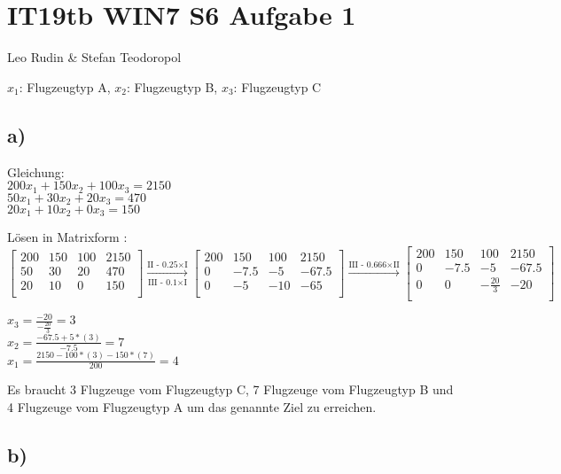 \documentclass{article}
\begin{document}
\section*{IT19tb WIN7 S6 Aufgabe 1}
Leo Rudin \& Stefan Teodoropol

\(x_1\): Flugzeugtyp A, \(x_2\): Flugzeugtyp B, \(x_3\): Flugzeugtyp C

\subsection*{a)}

Gleichung:\\
\(200x_1 + 150x_2 + 100x_3 = 2150\)\\
\(50x_1 + 30x_2 + 20x_3 = 470\)\\
\(20x_1 + 10x_2 + 0x_3 = 150\)

Lösen in Matrixform :
\[
\begin{bmatrix} 
200 & 150 & 100 & 2150 \\
50 & 30 & 20 & 470 \\
20 & 10 & 0 & 150 \\
\end{bmatrix}
\xrightarrow[\text{III - 0.1}\times\text{I}]{\text{II - 0.25}\times\text{I}}
\begin{bmatrix} 
200 & 150 & 100 & 2150 \\
0 & -7.5 & -5 & -67.5 \\
0 & -5 & -10 & -65 \\
\end{bmatrix}
\xrightarrow{\text{III - 0.666}\times\text{II}}
\begin{bmatrix} 
200 & 150 & 100 & 2150 \\
0 & -7.5 & -5 & -67.5 \\
0 & 0 & -\frac{20}{3} & -20 \\
\end{bmatrix}
\]

\(x_3 = \frac{-20}{-\frac{20}{3}} = 3\)\\
\(x_2 = \frac{-67.5 + 5*(3)}{-7.5} = 7\)\\
\(x_1 = \frac{2150 - 100*(3) - 150*(7)}{200} = 4\)

Es braucht 3 Flugzeuge vom Flugzeugtyp C, 7 Flugzeuge vom Flugzeugtyp B und 4 Flugzeuge vom Flugzeugtyp A um das genannte Ziel zu erreichen.

\newpage
\subsection*{b)}
\end{document}
